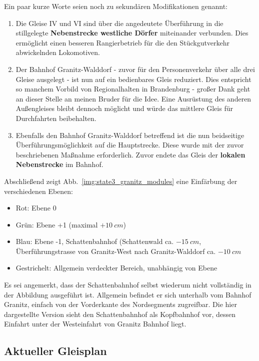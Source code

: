 Ein paar kurze Worte seien noch zu sekund\"aren Modifikationen genannt:
\begin{enumerate}
	\item Die Gleise IV und VI sind \"uber die angedeutete \"Uberf\"uhrung in die stillgelegte \textbf{Nebenstrecke westliche D\"orfer} miteinander verbunden.
	Dies erm\"oglicht einen besseren Rangierbetrieb f\"ur die den St\"uckgutverkehr abwickelnden Lokomotiven.
	\item Der Bahnhof Granitz-Walddorf - zuvor f\"ur den Personenverkehr \"uber alle drei Gleise ausgelegt - ist nun auf ein bedienbares Gleis reduziert.
	Dies entspricht so manchem Vorbild von Regionalhalten in Brandenburg - gro{\ss}er Dank geht an dieser Stelle an meinen Bruder f\"ur die Idee.
	Eine Ausr\"ustung des anderen Au{\ss}engleises bleibt dennoch m\"oglicht und w\"urde das mittlere Gleis f\"ur Durchfahrten beibehalten.
	\item Ebenfalls den Bahnhof Granitz-Walddorf betreffend ist die nun beidseitige \"Uberf\"uhrungsm\"oglichkeit auf die Hauptstrecke.
	Diese wurde mit der zuvor beschriebenen Ma{\ss}nahme erforderlich.
	Zuvor endete das Gleis der \textbf{lokalen Nebenstrecke} im Bahnhof.
\end{enumerate}

Abschlie{\ss}end zeigt Abb.~\ref{img:state3_granitz_modules} eine Einf\"arbung der verschiedenen Ebenen:
\begin{itemize}
	\item Rot: Ebene 0
	\item Gr\"un: Ebene +1 (maximal $+10~cm$)
	\item Blau: Ebene -1, Schattenbahnhof (Schattenwald ca. $-15~cm$, \"Uberf\"uhrungstrasse von Granitz-West nach Granitz-Walddorf ca. $-10~cm$
	\item Gestrichelt: Allgemein verdeckter Bereich, unabh\"angig von Ebene
\end{itemize}
Es sei angemerkt, dass der Schattenbahnhof selbst wiederum nicht vollst\"andig in der Abbildung ausgef\"uhrt ist.
Allgemein befindet er sich unterhalb vom Bahnhof Granitz, einfach von der Vorderkante des Nordsegments zugreifbar.
Die hier dargestellte Version sieht den Schattenbahnhof als Kopfbahnhof vor, dessen Einfahrt unter der Westeinfahrt von Granitz Bahnhof liegt.





\subsection{Aktueller Gleisplan}
\label{sec:map_date}

